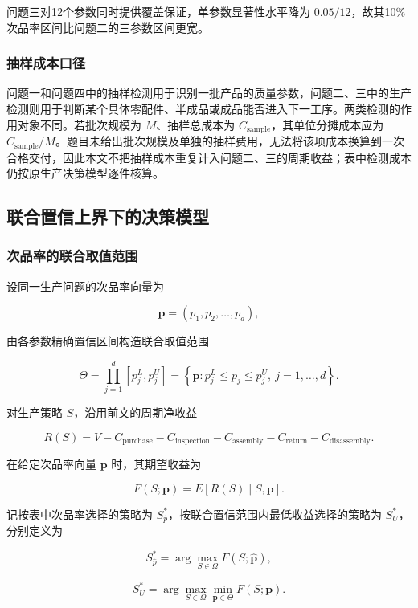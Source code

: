 \documentclass{cumcm}
\numberwithin{figure}{section}
\numberwithin{table}{section}
\begin{document}
问题三对12个参数同时提供覆盖保证，单参数显著性水平降为 \(0.05/12\)，故其10\%次品率区间比问题二的三参数区间更宽。

\subsubsection{抽样成本口径}\label{ux62bdux6837ux6210ux672cux53e3ux5f84}

问题一和问题四中的抽样检测用于识别一批产品的质量参数，问题二、三中的生产检测则用于判断某个具体零配件、半成品或成品能否进入下一工序。两类检测的作用对象不同。若批次规模为 \(M\)、抽样总成本为 \(C_{\mathrm{sample}}\)，其单位分摊成本应为 \(C_{\mathrm{sample}}/M\)。题目未给出批次规模及单独的抽样费用，无法将该项成本换算到一次合格交付，因此本文不把抽样成本重复计入问题二、三的周期收益；表中检测成本仍按原生产决策模型逐件核算。

\subsection{联合置信上界下的决策模型}\label{ux8054ux5408ux7f6eux4fe1ux4e0aux754cux4e0bux7684ux51b3ux7b56ux6a21ux578b}

\subsubsection{次品率的联合取值范围}\label{ux6b21ux54c1ux7387ux7684ux8054ux5408ux53d6ux503cux8303ux56f4}

设同一生产问题的次品率向量为

\[
\boldsymbol p=(p_1,p_2,\ldots,p_d),
\]

由各参数精确置信区间构造联合取值范围

\[
\Theta=\prod_{j=1}^{d}[p_j^L,p_j^U]
=\left\{\boldsymbol p:p_j^L\leq p_j\leq p_j^U,\ j=1,\ldots,d\right\}.
\]

对生产策略 \(S\)，沿用前文的周期净收益

\[
R(S)=V-C_{\mathrm{purchase}}-C_{\mathrm{inspection}}
-C_{\mathrm{assembly}}-C_{\mathrm{return}}-C_{\mathrm{disassembly}}.
\]

在给定次品率向量 \(\boldsymbol p\) 时，其期望收益为

\[
F(S;\boldsymbol p)=E[R(S)\mid S,\boldsymbol p].
\]

记按表中次品率选择的策略为 \(S_{\hat p}^*\)，按联合置信范围内最低收益选择的策略为 \(S_U^*\)，分别定义为

\[
S_{\hat p}^*
=\arg\max_{S\in\Omega}F(S;\hat{\boldsymbol p}),
\]

\[
S_U^*
=\arg\max_{S\in\Omega}
\min_{\boldsymbol p\in\Theta}F(S;\boldsymbol p).
\]
\end{document}
